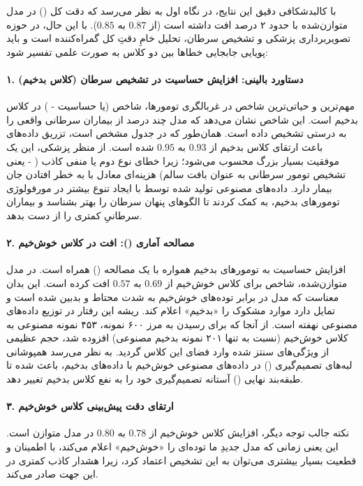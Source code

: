 \documentclass{article}
\begin{document}
با کالبدشکافی دقیق این نتایج، در نگاه اول به نظر می‌رسد که دقت کل () در مدل متوازن‌شده با  حدود ۲ درصد افت داشته است (از $0.87$ به $0.85$). با این حال، در حوزه تصویربرداری پزشکی و تشخیص سرطان، تحلیل خامِ دقتِ کل گمراه‌کننده است و باید پویایی جابجایی خطاها بین دو کلاس به صورت علمی تفسیر شود:

\paragraph{۱. دستاورد بالینی: افزایش حساسیت در تشخیص سرطان (کلاس بدخیم)}
مهم‌ترین و حیاتی‌ترین شاخص در غربالگری تومورها، شاخص  (یا حساسیت - ) در کلاس بدخیم است. این شاخص نشان می‌دهد که مدل چند درصد از بیماران سرطانی واقعی را به درستی تشخیص داده است. 
همان‌طور که در جدول مشخص است، تزریق داده‌های  باعث ارتقای  کلاس بدخیم از $0.93$ به $0.95$ شده است. از منظر پزشکی، این یک موفقیت بسیار بزرگ محسوب می‌شود؛ زیرا خطای نوع دوم یا منفی کاذب ( - یعنی تشخیص تومور سرطانی به عنوان بافت سالم) هزینه‌ای معادل با به خطر افتادن جان بیمار دارد. داده‌های مصنوعی تولید شده توسط  با ایجاد تنوع بیشتر در مورفولوژی تومورهای بدخیم، به  کمک کردند تا الگوهای پنهان سرطان را بهتر بشناسد و بیماران سرطانیِ کمتری را از دست بدهد.

\paragraph{۲. مصالحه آماری (): افت  در کلاس خوش‌خیم}
افزایش حساسیت به تومورهای بدخیم همواره با یک مصالحه () همراه است. در مدل متوازن‌شده، شاخص  برای کلاس خوش‌خیم از $0.69$ به $0.57$ افت کرده است. این بدان معناست که مدل در برابر توده‌های خوش‌خیم به شدت محتاط و بدبین شده است و تمایل دارد موارد مشکوک را «بدخیم» اعلام کند. 
ریشه این رفتار در توزیع داده‌های مصنوعی نهفته است. از آنجا که برای رسیدن به مرز ۶۰۰ نمونه، ۴۵۳ نمونه مصنوعی به کلاس خوش‌خیم (نسبت به تنها ۲۰۱ نمونه بدخیم مصنوعی) افزوده شد، حجم عظیمی از ویژگی‌های سنتز شده وارد فضای این کلاس گردید. به نظر می‌رسد همپوشانی لبه‌های تصمیم‌گیری () در داده‌های مصنوعی خوش‌خیم با داده‌های بدخیم، باعث شده تا طبقه‌بند نهایی () آستانه تصمیم‌گیری خود را به نفع کلاس بدخیم تغییر دهد.

\paragraph{۳. ارتقای دقت پیش‌بینی کلاس خوش‌خیم}
نکته جالب توجه دیگر، افزایش  کلاس خوش‌خیم از $0.78$ به $0.80$ در مدل متوازن است. این یعنی زمانی که مدل جدیدِ ما توده‌ای را «خوش‌خیم» اعلام می‌کند، با اطمینان و قطعیت بسیار بیشتری می‌توان به این تشخیص اعتماد کرد، زیرا هشدار کاذب کمتری در این جهت صادر می‌کند.
\end{document}

